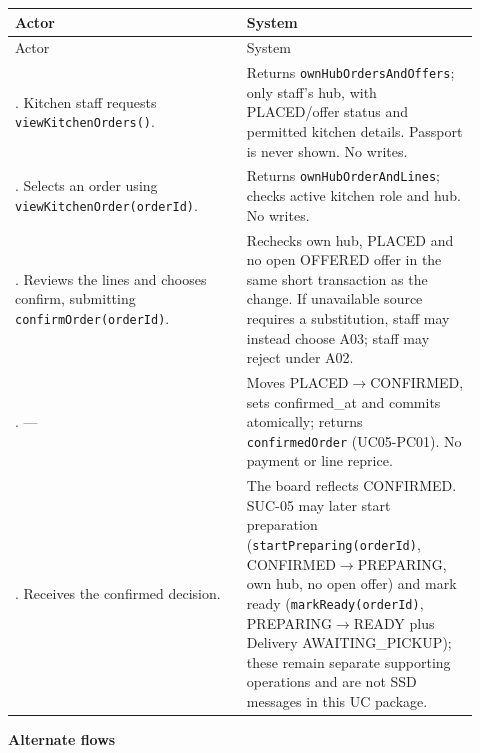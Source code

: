 \begin{longtable}{>{\raggedright\arraybackslash}p{0.4600\linewidth}>{\raggedright\arraybackslash}p{0.4600\linewidth}}
Actor & System \\
\hline\endfirsthead
Actor & System \\
\hline\endhead
1. Kitchen staff requests \texttt{viewKitchenOrders()}. & Returns \texttt{ownHubOrdersAndOffers}; only staff's hub, with PLACED/offer status and permitted kitchen details. Passport is never shown. No writes. \\
2. Selects an order using \texttt{viewKitchenOrder(orderId)}. & Returns \texttt{ownHubOrderAndLines}; checks active kitchen role and hub. No writes. \\
3. Reviews the lines and chooses confirm, submitting \texttt{confirmOrder(orderId)}. & Rechecks own hub, PLACED and no open OFFERED offer in the same short transaction as the change. If unavailable source requires a substitution, staff may instead choose A03; staff may reject under A02. \\
4. --- & Moves PLACED\ensuremath{\rightarrow}CONFIRMED, sets confirmed\_at and commits atomically; returns \texttt{confirmedOrder} (UC05-PC01). No payment or line reprice. \\
5. Receives the confirmed decision. & The board reflects CONFIRMED. SUC-05 may later start preparation (\texttt{startPreparing(orderId)}, CONFIRMED\ensuremath{\rightarrow}PREPARING, own hub, no open offer) and mark ready (\texttt{markReady(orderId)}, PREPARING\ensuremath{\rightarrow}READY plus Delivery AWAITING\_PICKUP); these remain separate supporting operations and are not SSD messages in this UC package. \\
\end{longtable}
\textbf{Alternate flows}


